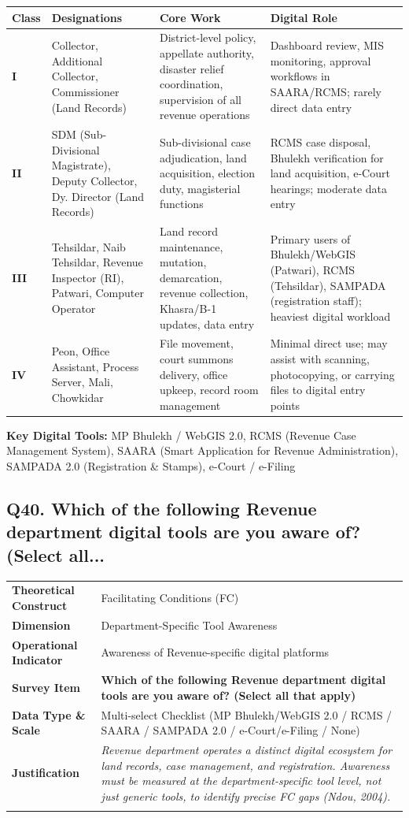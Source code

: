\documentclass[11pt,a4paper]{article}
\makeatletter
\newcommand{\qcard}[8]{%
\noindent\begin{tabularx}{\textwidth}{@{}>{\columncolor{#7}\bfseries\small}L{3.2cm}|X@{}}
\arrayrulecolor{#8}\hline
Theoretical Construct & #1 \\
Dimension & #2 \\
Operational Indicator & #3 \\
\arrayrulecolor{gold}\hline
\rowcolor{white}\textbf{\color{#8}Survey Item} & \textbf{\color{#8}#4} \\
\arrayrulecolor{gold}\hline
Data Type \& Scale & #5 \\
Justification & \textit{#6} \\
\arrayrulecolor{#8}\hline
\end{tabularx}\vspace{10pt}
}
\makeatother
\begin{document}
\begin{table}[H]\centering\small
\begin{tabularx}{\textwidth}{L{1.2cm} L{3.5cm} L{4.5cm} X}
\toprule
\textbf{Class} & \textbf{Designations} & \textbf{Core Work} & \textbf{Digital Role} \\
\midrule
\textbf{I} & Collector, Additional Collector, Commissioner (Land Records) & District-level policy, appellate authority, disaster relief coordination, supervision of all revenue operations & Dashboard review, MIS monitoring, approval workflows in SAARA/RCMS; rarely direct data entry \\[4pt]
\textbf{II} & SDM (Sub-Divisional Magistrate), Deputy Collector, Dy. Director (Land Records) & Sub-divisional case adjudication, land acquisition, election duty, magisterial functions & RCMS case disposal, Bhulekh verification for land acquisition, e-Court hearings; moderate data entry \\[4pt]
\textbf{III} & Tehsildar, Naib Tehsildar, Revenue Inspector (RI), Patwari, Computer Operator & Land record maintenance, mutation, demarcation, revenue collection, Khasra/B-1 updates, data entry & Primary users of Bhulekh/WebGIS (Patwari), RCMS (Tehsildar), SAMPADA (registration staff); heaviest digital workload \\[4pt]
\textbf{IV} & Peon, Office Assistant, Process Server, Mali, Chowkidar & File movement, court summons delivery, office upkeep, record room management & Minimal direct use; may assist with scanning, photocopying, or carrying files to digital entry points \\
\bottomrule
\end{tabularx}
\end{table}

\textbf{Key Digital Tools:} MP Bhulekh / WebGIS 2.0, RCMS (Revenue Case Management System), SAARA (Smart Application for Revenue Administration), SAMPADA 2.0 (Registration \& Stamps), e-Court / e-Filing

\subsection*{Q40. Which of the following Revenue department digital tools are you aware of? (Select all...}
\qcard{Facilitating Conditions (FC)}{Department-Specific Tool Awareness}{Awareness of Revenue-specific digital platforms}{Which of the following Revenue department digital tools are you aware of? (Select all that apply)}{Multi-select Checklist (MP Bhulekh/WebGIS 2.0 / RCMS / SAARA / SAMPADA 2.0 / e-Court/e-Filing / None)}{Revenue department operates a distinct digital ecosystem for land records, case management, and registration. Awareness must be measured at the department-specific tool level, not just generic tools, to identify precise FC gaps (Ndou, 2004).}{revbg}{revcol}
\end{document}
